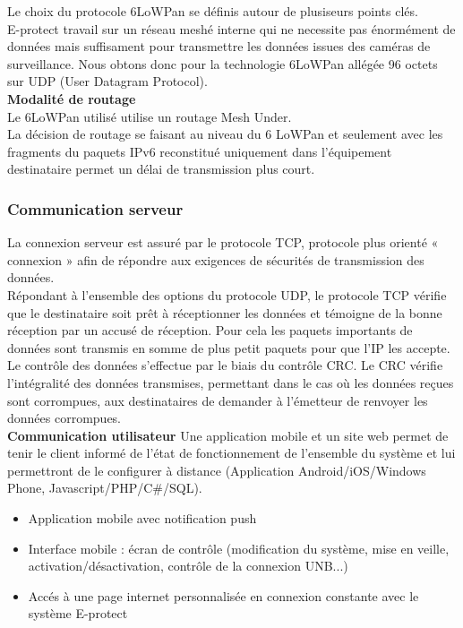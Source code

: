 Le choix du protocole 6LoWPan se définis autour de plusiseurs points clés.\\
E-protect travail sur un réseau meshé interne qui ne necessite pas énormément de données mais suffisament pour transmettre les données issues des caméras de surveillance. Nous obtons donc pour la technologie 6LoWPan allégée 96 octets sur UDP (User Datagram Protocol).\\

\textbf{Modalité de routage}\\
Le 6LoWPan utilisé utilise un routage Mesh Under.\\
La décision de routage se faisant au niveau du 6 LoWPan et seulement avec les fragments du paquets IPv6 reconstitué uniquement dans l'équipement destinataire permet un délai de transmission plus court.\cite{www:contiki}\\

\subsubsection{Communication serveur}
La connexion serveur est assuré par le protocole TCP, protocole plus orienté « connexion » afin de répondre aux exigences de sécurités de transmission des données.\\ 
Répondant à l’ensemble des options du protocole UDP, le protocole TCP vérifie que le destinataire soit prêt à réceptionner les données et témoigne de la bonne réception par un accusé de réception. Pour cela les paquets importants de données sont transmis en somme de plus petit paquets pour que l’IP les accepte.\\
Le contrôle des données s’effectue par le biais du contrôle CRC. Le CRC vérifie l’intégralité des données transmises, permettant dans le cas où les données reçues sont corrompues, aux destinataires de demander à l'émetteur de renvoyer les données corrompues.\cite{www:contiki}\\

\textbf{Communication utilisateur} %
Une application mobile et un site web permet de tenir le client informé de l'état de fonctionnement de l'ensemble du système et lui permettront de le configurer à distance (Application Android/iOS/Windows Phone, Javascript/PHP/C\#/SQL).\\
\begin{itemize}
\item Application mobile avec notification push
\item Interface mobile : écran de contrôle (modification du système, mise en veille, activation/désactivation, contrôle de la connexion UNB...)
\item Accés à une page internet personnalisée en connexion constante avec le système E-protect\\
\end{itemize}

